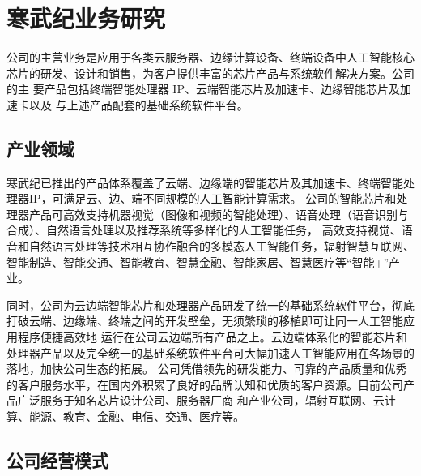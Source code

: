 
\section{寒武纪业务研究}
\quad \quad 公司的主营业务是应用于各类云服务器、边缘计算设备、终端设备中人工智能核心
芯片的研发、设计和销售，为客户提供丰富的芯片产品与系统软件解决方案。公司的主
要产品包括终端智能处理器 IP、云端智能芯片及加速卡、边缘智能芯片及加速卡以及
与上述产品配套的基础系统软件平台。
\subsection{产业领域}
寒武纪已推出的产品体系覆盖了云端、边缘端的智能芯片及其加速卡、终端智能处理器IP，可满足云、边、端不同规模的人工智能计算需求。
公司的智能芯片和处理器产品可高效支持机器视觉（图像和视频的智能处理）、语音处理（语音识别与合成）、自然语言处理以及推荐系统等多样化的人工智能任务，
高效支持视觉、语音和自然语言处理等技术相互协作融合的多模态人工智能任务，辐射智慧互联网、智能制造、智能交通、智能教育、智慧金融、智能家居、智慧医疗等“智能+”产业。\par
同时，公司为云边端智能芯片和处理器产品研发了统一的基础系统软件平台，彻底打破云端、边缘端、终端之间的开发壁垒，无须繁琐的移植即可让同一人工智能应用程序便捷高效地
运行在公司云边端所有产品之上。云边端体系化的智能芯片和处理器产品以及完全统一的基础系统软件平台可大幅加速人工智能应用在各场景的落地，加快公司生态的拓展。
公司凭借领先的研发能力、可靠的产品质量和优秀的客户服务水平，在国内外积累了良好的品牌认知和优质的客户资源。目前公司产品广泛服务于知名芯片设计公司、服务器厂商
和产业公司，辐射互联网、云计算、能源、教育、金融、电信、交通、医疗等。
\subsection{公司经营模式}

